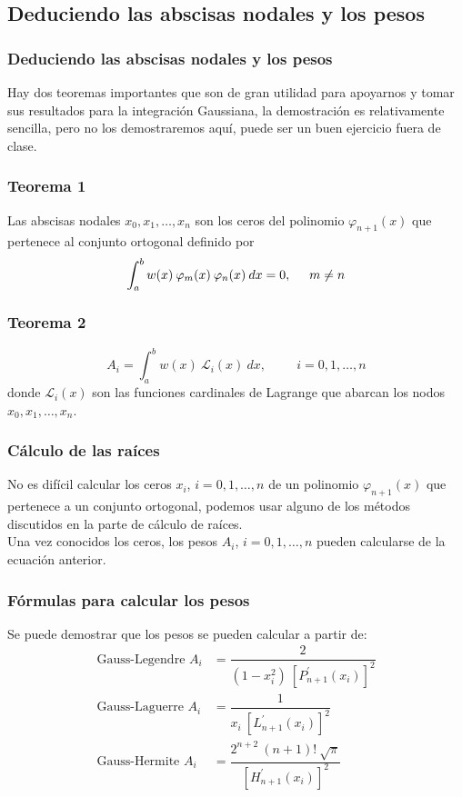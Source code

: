 \subsection{Deduciendo las abscisas nodales y los pesos}
\begin{frame}
\frametitle{Deduciendo las abscisas nodales y los pesos}
Hay dos teoremas importantes que son de gran utilidad para apoyarnos y tomar sus resultados para la integración Gaussiana, la demostración es relativamente sencilla, pero no los demostraremos aquí, puede ser un buen ejercicio fuera de clase.
\end{frame}
\begin{frame}
\frametitle{Teorema 1}
\begin{miteorema}
Las abscisas nodales $x_{0},x_{1},\ldots,x_{n}$ son los ceros del polinomio $\varphi_{n+1}(x)$  que pertenece al conjunto ortogonal definido por
\[ \int_{a}^{b} w(x) \: \varphi_{m}(x) \: \varphi_{n}(x) \: dx = 0, \hspace{0.5cm} m \neq n \]
\end{miteorema}
\end{frame}
\begin{frame}
\frametitle{Teorema 2}
\begin{miteorema}
\[ A_{i} = \int_{a}^{b} w(x) \: \mathcal{L}_{i} (x) \: dx, \hspace{1cm} i = 0, 1, \ldots, n \]
donde $\mathcal{L}_{i} (x)$ son las funciones cardinales de Lagrange que abarcan los nodos $x_{0}, x_{1}, \ldots, x_{n}$.
\end{miteorema}
\end{frame}
\begin{frame}
\frametitle{Cálculo de las raíces}
No es difícil calcular los ceros $x_{i}$, $i = 0, 1, \ldots, n$ de un polinomio $\varphi_{n + 1} (x)$ que pertenece a un conjunto ortogonal, podemos usar alguno de los métodos discutidos en la parte de cálculo de raíces.
\\
\bigskip
Una vez conocidos los ceros, los pesos $A_{i}$, $i = 0, 1, \ldots, n$ pueden calcularse de la ecuación anterior.
\end{frame}
\begin{frame}
\frametitle{Fórmulas para calcular los pesos}
Se puede demostrar que los pesos se pueden calcular a partir de:
\begin{align*}
\mbox{Gauss-Legendre   }  A_{i} &= \dfrac{2}{(1 - x^{2}_{i}) \: \left[P^{\prime}_{n + 1} (x_{i}) \right]^{2}} \\[1em]
\mbox{Gauss-Laguerre   } A_{i} &= \dfrac{1}{x_{i} \: \left[L^{\prime}_{n + 1} (x_{i}) \right]^{2}} \\[1em]
\mbox{Gauss-Hermite   } A_{i} &= \dfrac{2^{n + 2} \: (n + 1)! \: \sqrt{\pi}}{\left[ H^{\prime}_{n + 1} (x_{i}) \right]^{2}}
\end{align*}
\end{frame}
